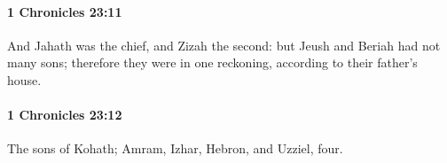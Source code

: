 		\paragraph{1 Chronicles 23:11} %
			\label{1CHRONICLES-23-11}

			And Jahath was the chief, and Zizah the second: but Jeush and Beriah had not many sons; therefore they were in one reckoning, according to their father’s house.


		\paragraph{1 Chronicles 23:12} %
			\label{1CHRONICLES-23-12}

			The sons of Kohath; Amram, Izhar, Hebron, and Uzziel, four.


